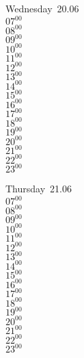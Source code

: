 \documentclass[11pt, a4paper]{book}\usepackage[]{graphicx}\usepackage[]{color}
\begin{document}
\begin{weekdaybox}
  Wednesday~20.06\\
  { 
  \vfill
  $07^{00}$\\
$08^{00}$\\
$09^{00}$\\
$10^{00}$\\
$11^{00}$\\
$12^{00}$\\
$13^{00}$\\
$14^{00}$\\
$15^{00}$\\
$16^{00}$\\
$17^{00}$\\
$18^{00}$\\
$19^{00}$\\
$20^{00}$\\
$21^{00}$\\
$22^{00}$\\
$23^{00}$\\
  }
\end{weekdaybox}
\clearpage
\begin{headerbox}
\end{headerbox}
\begin{weekdaybox}
  Thursday~21.06\\
  { 
  \vfill
  $07^{00}$\\
$08^{00}$\\
$09^{00}$\\
$10^{00}$\\
$11^{00}$\\
$12^{00}$\\
$13^{00}$\\
$14^{00}$\\
$15^{00}$\\
$16^{00}$\\
$17^{00}$\\
$18^{00}$\\
$19^{00}$\\
$20^{00}$\\
$21^{00}$\\
$22^{00}$\\
$23^{00}$\\
  }
\end{weekdaybox} 
\end{document}

